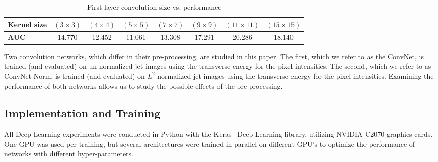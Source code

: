 \begin{table}[h!]
  \centering
  \begin{tabular}{l|c|c|c|c|c|c|c}
    \bfseries Kernel size &  $(3 \times 3)$ & $(4 \times 4)$ & $(5 \times 5)$ & $(7 \times 7)$ & $(9 \times 9)$  & $(11 \times 11)$ & $(15 \times 15)$ \\ 
    \hline
    \bfseries AUC & 14.770 & 12.452 & 11.061 & 13.308 & 17.291 & 20.286 & 18.140 
  \end{tabular}
  \caption{First layer convolution size vs. performance}
  \label{tab:kernelsize}
\end{table}

Two convolution networks, which differ in their pre-processing, are studied in this paper.  The first, which we refer to as the ConvNet, is trained (and evaluated) on un-normalized jet-images using the transverse energy for the pixel intensities.  The second, which we refer to as ConvNet-Norm, is trained (and evaluated) on $L^{2}$ normalized jet-images using the transverse-energy for the pixel intensities.  Examining the performance of both networks allows us to study the possible effects of the pre-processing.




\subsection{Implementation and Training} %
\label{ssub:implementation_and_training}

All Deep Learning experiments were conducted in Python with the Keras~\cite{Keras} Deep Learning library, utilizing NVIDIA C2070 graphics cards. One GPU was used per training, but several architectures were trained in parallel on different GPU's to optimize the performance of networks with different hyper-parameters.

